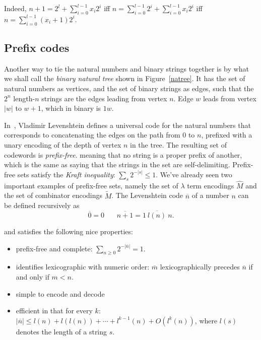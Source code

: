 \documentclass{article}
\newcommand{\brr}[1]{\overline{#1}}
\begin{document}
Indeed, $n+1=2^l+\sum_{i=0}^{l-1}x_i 2^i$ iff $n=\sum_{i=0}^{l-1}2^i + \sum_{i=0}^{l-1}x_i 2^i$
iff $n=\sum_{i=0}^{l-1} (x_i+1) 2^i$.

\subsection{Prefix codes}

Another way to tie the natural numbers and binary strings together
is by what we shall call the {\em binary natural tree} shown in Figure~\ref{natree}.
It has the set of natural numbers as vertices,
and the set of binary strings as edges,
such that the $2^n$ length-$n$ strings
are the edges leading from vertex $n$.
Edge $w$ leads from vertex $|w|$ to $w+1$, which in binary is $1w$.

In~\cite{L68}, Vladimir Levenshtein defines a universal code for
the natural numbers that corresponds to
concatenating the edges on the path from $0$ to $n$, %
prefixed with a unary encoding of the depth of vertex $n$ in the tree.
The resulting set of codewords is {\em prefix-free}.
meaning that no string is a proper prefix of another,
which is the same as saying that the strings in the set are self-delimiting.
Prefix-free sets satisfy the {\em Kraft inequality}: $\sum_{s} 2^{-|s|} \leq 1$.
We've already seen two important examples of prefix-free sets, namely
the set of $\lambda$ term encodings $\widehat{M}$ and the
set of combinator encodings $\widetilde{M}$.
The Levenshtein code $\brr{n}$ of a number $n$ can be defined recursively as
\[\brr{0} = 0\ \ \ \ \ \ \ \ \brr{n+1} = 1\ \brr{l(n)}\ n. \]

and satisfies the following nice properties:

\begin{itemize}
\item prefix-free and complete: $\sum_{n \geq 0} 2^{-|\brr{n}|} = 1$.
\item identifies lexicographic with numeric order: $\brr{m}$ lexicographically precedes $\brr{n}$ if and only if $m<n$.
\item simple to encode and decode
\item efficient in that for every $k$:
$|\brr{n}| \leq l(n)+l(l(n))+\cdots+ l^{k-1}(n) + O(l^k(n))$,
where $l(s)$ denotes the length of a string $s$.
\end{itemize}
\end{document}
